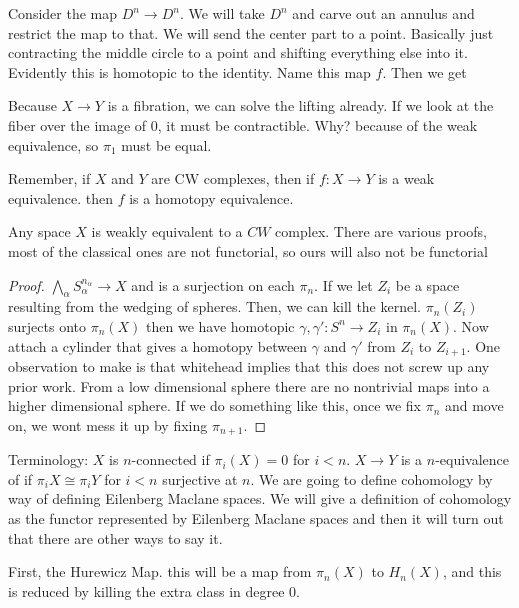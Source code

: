 \documentclass[12pt]{article}
\theoremstyle{definition}
\begin{document}
Consider the map $D^n\to D^n$. We will take $D^n$ and carve out an annulus and restrict the map to that. We will send the center part to a point. Basically just contracting the middle circle to a point and shifting everything else into it. Evidently this is homotopic to the identity. Name this map $f$. Then we get \begin{center}
\end{center}
Because $X\to Y$ is a fibration, we can solve the lifting already. If we look at the fiber over the image of $0$, it must be contractible. Why? because of the weak equivalence, so $\pi_1$ must be equal. 

Remember, if $X$ and $Y$ are CW complexes, then if $f:X\to Y$ is a weak equivalence. then $f$ is a homotopy equivalence. 

Any space $X$ is weakly equivalent to a $CW$ complex. There are various proofs, most of the classical ones are not functorial, so ours will also not be functorial
\begin{proof}
	$\bigwedge_{\alpha}S_\alpha^{n_\alpha}\to X$ and is a surjection on each $\pi_n$. If we let $Z_i$ be a space resulting from the wedging of spheres. Then, we can kill the kernel. $\pi_n(Z_i)$ surjects onto $\pi_n(X)$ then we have homotopic $\gamma, \gamma':S^n\to Z_i$ in $\pi_n(X)$. Now attach a cylinder that gives a homotopy between $\gamma $ and $\gamma'$ from $Z_i$ to $Z_{i+1}$. One observation to make is that whitehead implies that this does not screw up any prior work. From a low dimensional sphere there are no nontrivial maps into a higher dimensional sphere. If we do something like this, once we fix $\pi_n$ and move on, we wont mess it up by fixing $\pi_{n+1}$.  \end{proof}

Terminology:
$X$ is $n$-connected if $\pi_i(X)=0$ for $i< n$. $X\to Y$ is a $n$-equivalence of if $\pi_i X\cong \pi_i Y$ for $i< n$ surjective at $n$. We are going to define cohomology by way of defining Eilenberg Maclane spaces. We will give a definition of cohomology as the functor represented by Eilenberg Maclane spaces and then it will turn out that there are other ways to say it. 

First, the Hurewicz Map. this will be a map from $\pi_n(X)$ to $H_n(X)$, and this is reduced by killing the extra class in degree $0$. 
\end{document}
